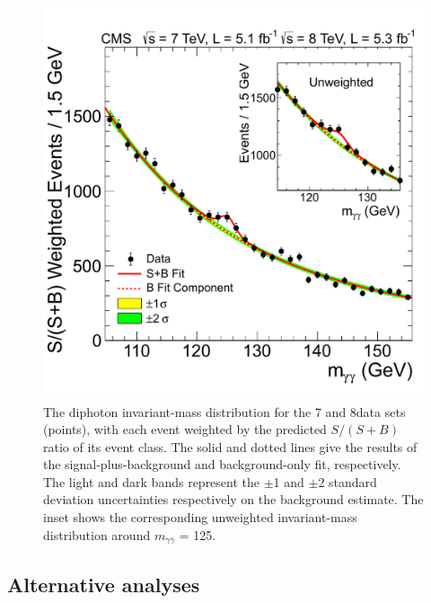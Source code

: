 \documentclass[12pt,twoside,a4paper,cmspaper,final,collab]{cms-tdr}
\begin{document}
\begin{figure}
 \begin{center}
   \includegraphics[width=0.63\linewidth]{figures/hgg_MassFactSoBWeightedMass}
   \caption{The diphoton invariant-mass
       distribution for the 7 and 8\TeV data sets (points), with each event weighted
       by the predicted $S/(S+B)$ ratio of its event class. The solid and dotted lines
       give the results of the signal-plus-background and background-only fit, respectively.
       The light and dark
       bands represent the $\pm$1 and $\pm$2 standard deviation
       uncertainties respectively on the background estimate.
       The inset shows the corresponding unweighted invariant-mass distribution around
      $m_{\gamma\gamma}$ = 125\GeV.
        }
   \label{fig:hgg_MassFactSoB}
 \end{center}
\end{figure}



\subsection{Alternative analyses}
\label{sec:hgg_crosscheck}
\end{document}
